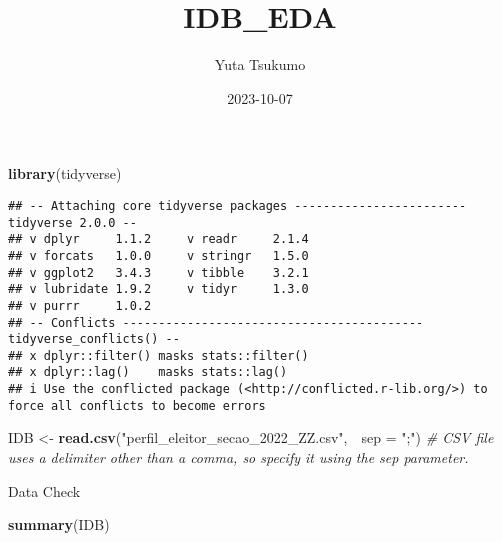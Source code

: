 \documentclass[
]{article}
\title{IDB\_EDA}
\author{Yuta Tsukumo}
\date{2023-10-07}
\newenvironment{Shaded}{\begin{snugshade}}{\end{snugshade}}
\newcommand{\AttributeTok}[1]{\textcolor[rgb]{0.13,0.29,0.53}{#1}}
\newcommand{\CommentTok}[1]{\textcolor[rgb]{0.56,0.35,0.01}{\textit{#1}}}
\newcommand{\FunctionTok}[1]{\textcolor[rgb]{0.13,0.29,0.53}{\textbf{#1}}}
\newcommand{\NormalTok}[1]{#1}
\newcommand{\OtherTok}[1]{\textcolor[rgb]{0.56,0.35,0.01}{#1}}
\newcommand{\StringTok}[1]{\textcolor[rgb]{0.31,0.60,0.02}{#1}}
\begin{document}
\maketitle

\begin{Shaded}
\begin{Highlighting}[]
\FunctionTok{library}\NormalTok{(tidyverse)}
\end{Highlighting}
\end{Shaded}

\begin{verbatim}
## -- Attaching core tidyverse packages ------------------------ tidyverse 2.0.0 --
## v dplyr     1.1.2     v readr     2.1.4
## v forcats   1.0.0     v stringr   1.5.0
## v ggplot2   3.4.3     v tibble    3.2.1
## v lubridate 1.9.2     v tidyr     1.3.0
## v purrr     1.0.2     
## -- Conflicts ------------------------------------------ tidyverse_conflicts() --
## x dplyr::filter() masks stats::filter()
## x dplyr::lag()    masks stats::lag()
## i Use the conflicted package (<http://conflicted.r-lib.org/>) to force all conflicts to become errors
\end{verbatim}

\begin{Shaded}
\begin{Highlighting}[]
\NormalTok{IDB }\OtherTok{\textless{}{-}} \FunctionTok{read.csv}\NormalTok{(}\StringTok{"perfil\_eleitor\_secao\_2022\_ZZ.csv"}\NormalTok{,　}\AttributeTok{sep =} \StringTok{";"}\NormalTok{)}
\CommentTok{\# CSV file uses a delimiter other than a comma, so specify it using the sep parameter. }
\end{Highlighting}
\end{Shaded}

Data Check

\begin{Shaded}
\begin{Highlighting}[]
\FunctionTok{summary}\NormalTok{(IDB)}
\end{Highlighting}
\end{Shaded}
\end{document}
